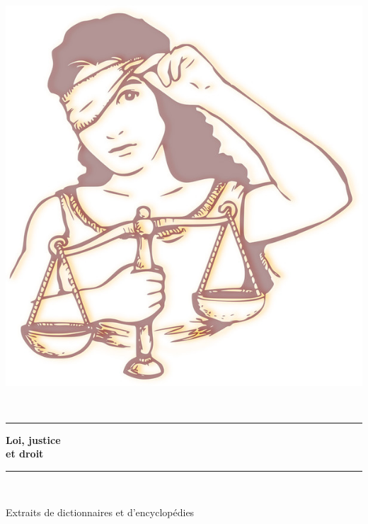 \begin{titlepage}
%
\newcommand{\HRule}{\rule{\linewidth}{0.5mm}}

\begin{center}
\includegraphics[scale=1.15]{./presentation/justice}
\end{center}

\textsc{\Large }\\[0.5cm]

\HRule

\begin{center}
{\huge \bfseries Loi, justice\\
et droit\\[0.4cm] }
\end{center}

\HRule \\[1.5cm]


\vfill

\hfill
\begin{minipage}{0.4\textwidth}
\begin{flushright} \large
Extraits de dictionnaires et d'encyclopédies
\end{flushright}
\end{minipage}


\end{titlepage}
